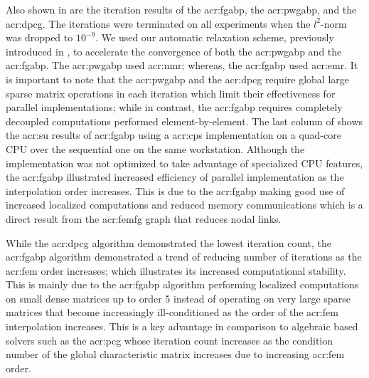 Also shown in  are the iteration results of the \gls{acr:fgabp}, the \gls{acr:pwgabp}, and the \gls{acr:dpcg}.
The iterations were terminated on all experiments when the $l^2$-norm was dropped to $10^{-9}$.
We used our automatic relaxation scheme, previously introduced in , to accelerate the convergence of both the \gls{acr:pwgabp} and the \gls{acr:fgabp}.
The \gls{acr:pwgabp} used \gls{acr:nmr}; whereas, the \gls{acr:fgabp} used \gls{acr:emr}.
It is important to note that the \gls{acr:pwgabp} and the \gls{acr:dpcg} require global large sparse matrix operations in each iteration which limit their effectiveness for parallel implementations; while in contrast, the \gls{acr:fgabp} requires completely decoupled computations performed element-by-element.
The last column of  shows the \gls{acr:su} results of \gls{acr:fgabp} using a \gls{acr:cps} implementation on a quad-core CPU over the sequential one on the same workstation.
Although the implementation was not optimized to take advantage of specialized CPU features, the \gls{acr:fgabp} illustrated increased efficiency of parallel implementation as the interpolation order increases.
This is due to the \gls{acr:fgabp} making good use of increased localized computations and reduced memory communications which is a direct result from the \gls{acr:femfg} graph that reduces nodal links.


While the \gls{acr:dpcg} algorithm demonstrated the lowest iteration count, the \gls{acr:fgabp} algorithm demonstrated a trend of reducing number of iterations as the \gls{acr:fem} order increases; which illustrates its increased computational stability.
This is mainly due to the \gls{acr:fgabp} algorithm performing localized computations on small dense matrices up to order 5 instead of operating on very large sparse matrices that become increasingly ill-conditioned as the order of the \gls{acr:fem} interpolation increases.
This is a key advantage in comparison to algebraic based solvers such as the \gls{acr:pcg} whose iteration count increases as the condition number of the global characteristic matrix increases due to increasing \gls{acr:fem} order.


